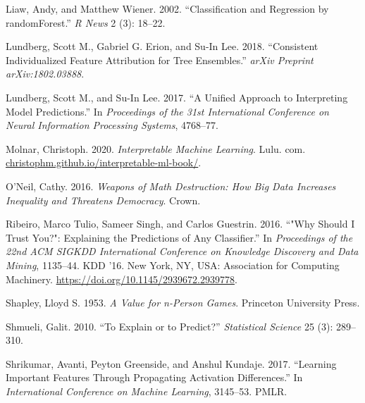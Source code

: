 \documentclass[
]{article}
\newlength{\cslhangindent}
\newlength{\cslentryspacingunit} %
\newenvironment{CSLReferences}[2] %
 {%
  \setlength{\parindent}{0pt}
  \ifodd #1
  \let\oldpar\par
  \def\par{\hangindent=\cslhangindent\oldpar}
  \fi
  \setlength{\parskip}{#2\cslentryspacingunit}
 }%
 {}
\begin{document}
\begin{CSLReferences}{1}{0}
\leavevmode{}%
Liaw, Andy, and Matthew Wiener. 2002. {``Classification and Regression by {randomForest}.''} \emph{R News} 2 (3): 18--22.

\leavevmode{}%
Lundberg, Scott M., Gabriel G. Erion, and Su-In Lee. 2018. {``Consistent Individualized Feature Attribution for Tree Ensembles.''} \emph{arXiv Preprint arXiv:1802.03888}.

\leavevmode{}%
Lundberg, Scott M., and Su-In Lee. 2017. {``A Unified Approach to Interpreting Model Predictions.''} In \emph{Proceedings of the 31st International Conference on Neural Information Processing Systems}, 4768--77.

\leavevmode{}%
Molnar, Christoph. 2020. \emph{Interpretable Machine Learning}. Lulu. com. \href{https://christophm.github.io/interpretable-ml-book/}{christophm.github.io/interpretable-ml-book/}.

\leavevmode{}%
O'Neil, Cathy. 2016. \emph{Weapons of Math Destruction: {How} Big Data Increases Inequality and Threatens Democracy}. Crown.

\leavevmode{}%
Ribeiro, Marco Tulio, Sameer Singh, and Carlos Guestrin. 2016. {``"{Why} {Should} {I} {Trust} {You}?": {Explaining} the {Predictions} of {Any} {Classifier}.''} In \emph{Proceedings of the 22nd {ACM} {SIGKDD} {International} {Conference} on {Knowledge} {Discovery} and {Data} {Mining}}, 1135--44. {KDD} '16. New York, NY, USA: Association for Computing Machinery. \url{https://doi.org/10.1145/2939672.2939778}.

\leavevmode{}%
Shapley, Lloyd S. 1953. \emph{A Value for n-Person Games}. Princeton University Press.

\leavevmode{}%
Shmueli, Galit. 2010. {``To Explain or to Predict?''} \emph{Statistical Science} 25 (3): 289--310.

\leavevmode{}%
Shrikumar, Avanti, Peyton Greenside, and Anshul Kundaje. 2017. {``Learning Important Features Through Propagating Activation Differences.''} In \emph{International {Conference} on {Machine} {Learning}}, 3145--53. PMLR.


\end{CSLReferences}
\end{document}
